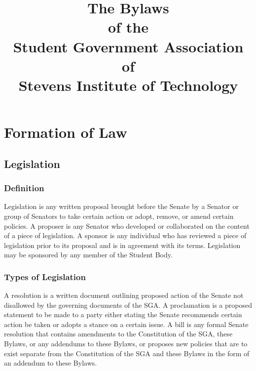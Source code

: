 \documentclass[12pt]{scrreprt}
\begin{document}
\title{The Bylaws \\ of the \\ Student Government Association \\ of \\ Stevens Institute of Technology}
\subtitle{}
\author{}
\date{}
\maketitle

\tableofcontents

\modulolinenumbers[1]
\linenumbers

\chapter{Formation of Law}

\section{Legislation}

\subsection{Definition}
Legislation is any written proposal brought before the Senate by a Senator or group of Senators to take certain action or adopt, remove, or amend certain policies. A proposer is any Senator who developed or collaborated on the content of a piece of legislation. A sponsor is any individual who has reviewed a piece of legislation prior to its proposal and is in agreement with its terms. Legislation may be sponsored by any member of the Student Body.

\subsection{Types of Legislation}
A resolution is a written document outlining proposed action of the Senate not disallowed by the governing documents of the SGA. A proclamation is a proposed statement to be made to a party either stating the Senate recommends certain action be taken or adopts a stance on a certain issue. A bill is any formal Senate resolution that contains amendments to the Constitution of the SGA, these Bylaws, or any addendums to these Bylaws, or proposes new policies that are to exist separate from the Constitution of the SGA and these Bylaws in the form of an addendum to these Bylaws.
\end{document}
